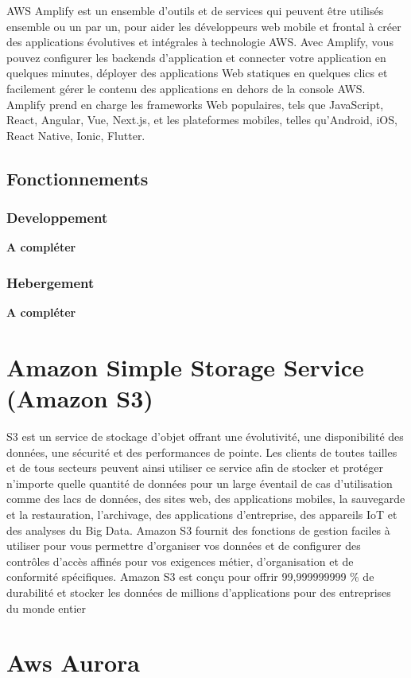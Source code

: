 AWS Amplify est un ensemble d’outils et de services qui peuvent être utilisés ensemble ou un par un, pour
aider les développeurs web mobile et frontal à créer des applications évolutives et intégrales à technologie
AWS. Avec Amplify, vous pouvez configurer les backends d’application et connecter votre application en
quelques minutes, déployer des applications Web statiques en quelques clics et facilement gérer le contenu
des applications en dehors de la console AWS.
Amplify prend en charge les frameworks Web populaires, tels que JavaScript, React, Angular, Vue, Next.js,
et les plateformes mobiles, telles qu’Android, iOS, React Native, Ionic, Flutter.
\subsection{Fonctionnements}
\subsubsection{Developpement}
\textbf{A compléter}
\subsubsection{Hebergement}
\textbf{A compléter}


\section{Amazon Simple Storage Service (Amazon S3)}

S3 est un service de stockage d’objet offrant une évolutivité, une disponibilité des données, une sécurité et des performances de pointe. Les clients de toutes tailles et de tous secteurs peuvent ainsi utiliser
ce service afin de stocker et protéger n’importe quelle quantité de données pour un large éventail de cas
d’utilisation comme des lacs de données, des sites web, des applications mobiles, la sauvegarde et la restauration, l’archivage, des applications d’entreprise, des appareils IoT et des analyses du Big Data. Amazon
S3 fournit des fonctions de gestion faciles à utiliser pour vous permettre d’organiser vos données et de
configurer des contrôles d’accès affinés pour vos exigences métier, d’organisation et de conformité spécifiques. Amazon S3 est conçu pour offrir 99,999999999 \% de durabilité et stocker les données de millions
d’applications pour des entreprises du monde entier

\section{Aws Aurora}

